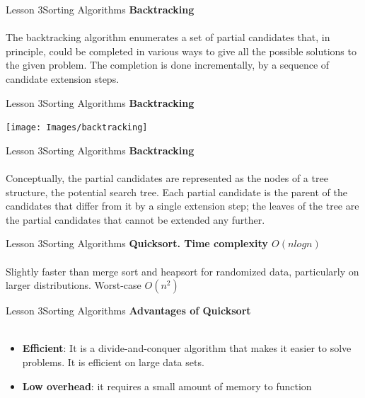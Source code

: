 \documentclass[aspectratio=1610]{beamer}
\begin{document}
\begin{frame}{Lesson 3}{Sorting Algorithms}
\LARGE
\textbf{Backtracking}\\~\\
\Large
The backtracking algorithm enumerates a set of partial candidates 
that, in principle, could be completed in various ways to give all 
the possible solutions to the given problem. The completion is done 
incrementally, by a sequence of candidate extension steps.
\end{frame}


\begin{frame}{Lesson 3}{Sorting Algorithms}
\LARGE
\textbf{Backtracking}\\
\begin{center}
\texttt{[image: Images/backtracking]}
\end{center}
\end{frame}



\begin{frame}{Lesson 3}{Sorting Algorithms}
\LARGE
\textbf{Backtracking}\\~\\
\Large
Conceptually, the partial candidates are represented as the nodes of
a tree structure, the potential search tree. Each partial candidate
is the parent of the candidates that differ from it by a single
extension step; the leaves of the tree are the partial candidates
that cannot be extended any further.
\end{frame}




\begin{frame}{Lesson 3}{Sorting Algorithms}
\LARGE
\textbf{Quicksort. Time complexity $O(n log n)$}\\~\\
Slightly faster than merge sort and heapsort for randomized data,
particularly on larger distributions. Worst-case $O(n^{2})$
\end{frame}


\begin{frame}{Lesson 3}{Sorting Algorithms}
\LARGE
\textbf{Advantages of Quicksort}\\~\\
\Large
\begin{itemize}
	\item \textbf{Efficient}: It is a divide-and-conquer algorithm that makes it easier to solve problems. It is efficient on large data sets.
	\item \textbf{Low overhead}: it requires a small amount of memory to function
\end{itemize}
\end{frame}
\end{document}
